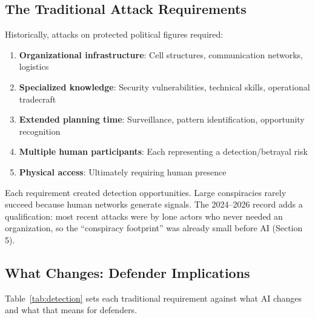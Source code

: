 \documentclass[11pt,letterpaper]{article}
\begin{document}
\subsection{The Traditional Attack Requirements}

Historically, attacks on protected political figures required:

\begin{enumerate}
  \item \textbf{Organizational infrastructure}: Cell structures, communication networks, logistics
  \item \textbf{Specialized knowledge}: Security vulnerabilities, technical skills, operational tradecraft
  \item \textbf{Extended planning time}: Surveillance, pattern identification, opportunity recognition
  \item \textbf{Multiple human participants}: Each representing a detection/betrayal risk
  \item \textbf{Physical access}: Ultimately requiring human presence
\end{enumerate}

Each requirement created detection opportunities. Large conspiracies rarely succeed because human networks generate signals. The 2024--2026 record adds a qualification: most recent attacks were by lone actors who never needed an organization, so the ``conspiracy footprint'' was already small before AI (Section 5).

\subsection{What Changes: Defender Implications}

Table~\ref{tab:detection} sets each traditional requirement against what AI changes and what that means for defenders.
\end{document}
